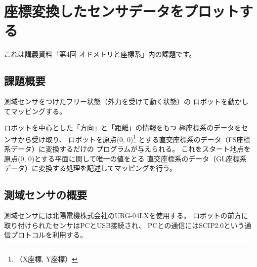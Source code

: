 \documentclass[main]{subfiles}
\begin{document}
\chapter{座標変換したセンサデータをプロットする}

これは講義資料「第4回 オドメトリと座標系」内の課題です。

\section{課題概要}
測域センサをつけたフリー状態（外力を受けて動く状態）の
ロボットを動かしてマッピングする。

ロボットを中心とした「方向」と「距離」の情報をもつ
極座標系のデータをセンサから受け取り、
ロボットを原点(0, 0)\footnote{（X座標, Y座標）}
とする直交座標系のデータ（FS座標系データ）に変換するだけの
プログラムが与えられる。
これをスタート地点を原点(0, 0)とする平面に関して唯一の値をとる
直交座標系のデータ（GL座標系データ）に変換する処理を記述してマッピングを行う。

\section{測域センサの概要}
測域センサには北陽電機株式会社のURG-04LXを使用する。
ロボットの前方に取り付けられたセンサはPCとUSB接続され、
PCとの通信にはSCIP2.0という通信プロトコルを利用する。
\end{document}
